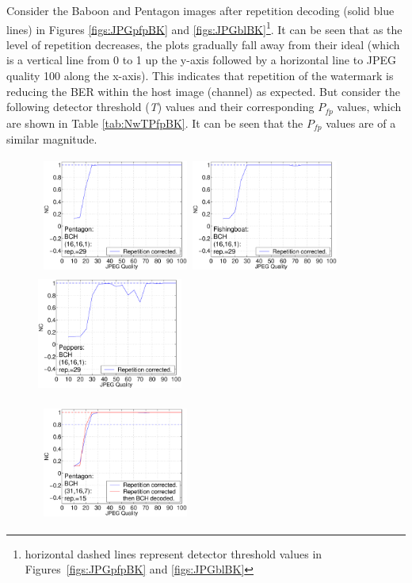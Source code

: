 \documentclass[12pt]{report}
\begin{document}
Consider the Baboon and Pentagon images after repetition
decoding (solid blue lines) in Figures \ref{figs:JPGpfpBK} and \ref{figs:JPGblBK}\footnote{horizontal dashed lines 
represent detector threshold values in 
Figures~\ref{figs:JPGpfpBK} and \ref{figs:JPGblBK}}.
It can be seen that as the level of repetition decreases,
the plots gradually fall away from their ideal (which is a vertical line from 0 to 1 up the y-axis followed
by a horizontal line to JPEG quality 100 along the x-axis). This indicates that repetition of the watermark is reducing the BER within 
the host image (channel) as expected. But consider the following detector threshold (\emph{T}) values and their corresponding
$P_{fp}$ values, which are shown in Table \ref{tab:NwTPfpBK}.
It can be seen that the $P_{fp}$ values are of a similar magnitude.
\begin{figure}[p]
\setlength{\abovecaptionskip}{-0.25cm}
\centerline{ \hbox{
\includegraphics[height=3.81cm,width=4.8cm]{EPS_BK_formattedBetter/JPGpent16.eps}
\includegraphics[height=3.81cm,width=4.8cm]{EPS_BK_formattedBetter/JPGfish16.eps}
\includegraphics[height=3.81cm,width=4.8cm]{EPS_BK_formattedBetter/JPGpep16.eps} \\
}}
\centerline{ \hbox{
\includegraphics[height=3.81cm,width=4.8cm]{EPS_BK_formattedBetter/JPGpent31.eps}
}}
\end{figure}
\end{document}
